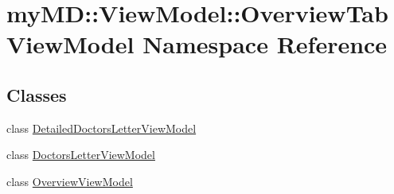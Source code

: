 \hypertarget{namespacemy_m_d_1_1_view_model_1_1_overview_tab_view_model}{
\section{my\-MD::View\-Model::Overview\-Tab\-View\-Model Namespace Reference}
\label{dc/dfc/namespacemy_m_d_1_1_view_model_1_1_overview_tab_view_model}
}


\subsection*{Classes}
\begin{CompactItemize}
\item 
class \hyperlink{classmy_m_d_1_1_view_model_1_1_overview_tab_view_model_1_1_detailed_doctors_letter_view_model}{Detailed\-Doctors\-Letter\-View\-Model}
\item 
class \hyperlink{classmy_m_d_1_1_view_model_1_1_overview_tab_view_model_1_1_doctors_letter_view_model}{Doctors\-Letter\-View\-Model}
\item 
class \hyperlink{classmy_m_d_1_1_view_model_1_1_overview_tab_view_model_1_1_overview_view_model}{Overview\-View\-Model}
\end{CompactItemize}
